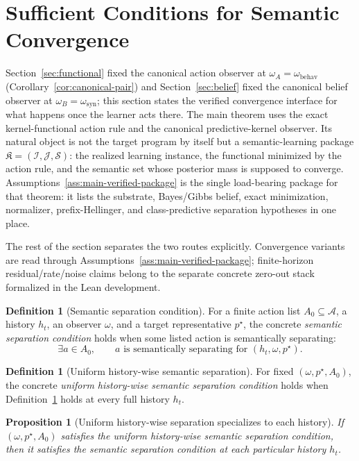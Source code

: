 \documentclass[11pt]{article}
\newtheorem{proposition}[theorem]{Proposition}
\theoremstyle{definition}
\newtheorem{definition}[theorem]{Definition}
\theoremstyle{remark}
\theoremstyle{plain}
\theoremstyle{definition}
\newcommand{\Acal}{\mathcal{A}}
\newcommand{\Scal}{\mathcal{S}}
\begin{document}
\section{Sufficient Conditions for Semantic Convergence}
\label{sec:main}

Section~\ref{sec:functional} fixed the canonical action observer at $\omega_A=\omega_{\mathrm{behav}}$ (Corollary~\ref{cor:canonical-pair}) and Section~\ref{sec:belief} fixed the canonical belief observer at $\omega_B=\omega_{\mathrm{syn}}$; this section states the verified convergence interface for what happens once the learner acts there. The main theorem uses the exact kernel-functional action rule and the canonical predictive-kernel observer. Its natural object is not the target program by itself but a semantic-learning package $\mathfrak K=(\mathcal I,\mathcal J,\Scal)$: the realized learning instance, the functional minimized by the action rule, and the semantic set whose posterior mass is supposed to converge. Assumptions~\ref{ass:main-verified-package} is the single load-bearing package for that theorem: it lists the substrate, Bayes/Gibbs belief, exact minimization, normalizer, prefix-Hellinger, and class-predictive separation hypotheses in one place.

The rest of the section separates the two routes explicitly. Convergence variants are read through Assumptions~\ref{ass:main-verified-package}; finite-horizon residual/rate/noise claims belong to the separate concrete zero-out stack formalized in the Lean development.

\begin{definition}[Semantic separation condition]
\label{def:sep-condition}
For a finite action list $A_0\subseteq\Acal$, a history $h_t$, an observer $\omega$, and a target representative $p^\star$, the concrete \emph{semantic separation condition} holds when some listed action is semantically separating:
\[
\exists a\in A_0,\qquad
a\text{ is semantically separating for }(h_t,\omega,p^\star).
\]
\end{definition}

\begin{definition}[Uniform history-wise semantic separation]
\label{def:uniform-history-independent-separation}
For fixed $(\omega,p^\star,A_0)$, the concrete \emph{uniform history-wise semantic separation condition} holds when Definition~\ref{def:sep-condition} holds at every full history $h_t$.
\end{definition}

\begin{proposition}[Uniform history-wise separation specializes to each history]
\label{prop:uniform-history-independent-implies-semantic}
If $(\omega,p^\star,A_0)$ satisfies the uniform history-wise semantic separation condition, then it satisfies the semantic separation condition at each particular history $h_t$.
\end{proposition}
\end{document}
